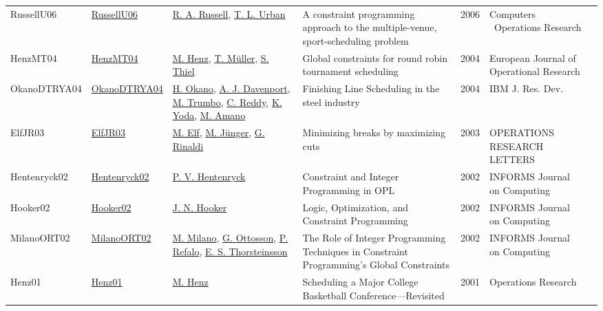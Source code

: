 {\begin{longtable}{p{2cm}p{2cm}p{5cm}p{10cm}rp{3cm}l}
RussellU06 & \href{http://dx.doi.org/10.1016/j.cor.2004.09.029}{RussellU06} & \hyperref[auth:a1434]{R. A. Russell}, \hyperref[auth:a1435]{T. L. Urban} & A constraint programming approach to the multiple-venue,  sport-scheduling problem & 2006 & Computers \  Operations Research & \cite{RussellU06}\\
HenzMT04 & \href{http://dx.doi.org/10.1016/s0377-2217(03)00101-2}{HenzMT04} & \hyperref[auth:a1420]{M. Henz}, \hyperref[auth:a1422]{T. M\"{u}ller}, \hyperref[auth:a1423]{S. Thiel} & Global constraints for round robin tournament scheduling & 2004 & European Journal of Operational Research & \cite{HenzMT04}\\
OkanoDTRYA04 & \href{https://doi.org/10.1147/rd.485.0811}{OkanoDTRYA04} & \hyperref[auth:a1289]{H. Okano}, \hyperref[auth:a248]{A. J. Davenport}, \hyperref[auth:a1290]{M. Trumbo}, \hyperref[auth:a250]{C. Reddy}, \hyperref[auth:a1291]{K. Yoda}, \hyperref[auth:a1292]{M. Amano} & Finishing Line Scheduling in the steel industry & 2004 & {IBM} J. Res. Dev. & \cite{OkanoDTRYA04}\\
ElfJR03 & \href{http://dx.doi.org/10.1016/s0167-6377(03)00025-7}{ElfJR03} & \hyperref[auth:a1407]{M. Elf}, \hyperref[auth:a1408]{M. Jünger}, \hyperref[auth:a1409]{G. Rinaldi} & \cellcolor{green!10}Minimizing breaks by maximizing cuts & 2003 & OPERATIONS RESEARCH LETTERS & \cite{ElfJR03}\\
Hentenryck02 & \href{http://dx.doi.org/10.1287/ijoc.14.4.345.2826}{Hentenryck02} & \hyperref[auth:a148]{P. V. Hentenryck} & Constraint and Integer Programming in OPL & 2002 & \cellcolor{red!20}INFORMS Journal on Computing & \cite{Hentenryck02}\\
Hooker02 & \href{http://dx.doi.org/10.1287/ijoc.14.4.295.2828}{Hooker02} & \hyperref[auth:a160]{J. N. Hooker} & Logic, Optimization, and Constraint Programming & 2002 & \cellcolor{red!20}INFORMS Journal on Computing & \cite{Hooker02}\\
MilanoORT02 & \href{http://dx.doi.org/10.1287/ijoc.14.4.387.2830}{MilanoORT02} & \hyperref[auth:a143]{M. Milano}, \hyperref[auth:a852]{G. Ottosson}, \hyperref[auth:a254]{P. Refalo}, \hyperref[auth:a874]{E. S. Thorsteinsson} & The Role of Integer Programming Techniques in Constraint Programming's Global Constraints & 2002 & \cellcolor{red!20}INFORMS Journal on Computing & \cite{MilanoORT02}\\
Henz01 & \href{http://dx.doi.org/10.1287/opre.49.1.163.11193}{Henz01} & \hyperref[auth:a1420]{M. Henz} & Scheduling a Major College Basketball Conference—Revisited & 2001 & Operations Research & \cite{Henz01}\\

\end{longtable}}
